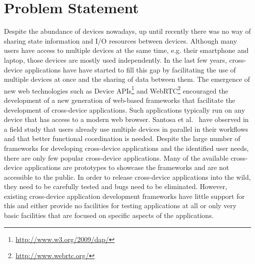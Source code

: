 \section{Problem Statement}

Despite the abundance of devices nowadays, up until recently there was no way of sharing state information and I/O resources between devices. Although many users have access to multiple devices at the same time, e.g. their smartphone and laptop, those devices are mostly used independently. In the last few years, cross-device applications have have started to fill this gap by facilitating the use of multiple devices at once and the sharing of data between them. The emergence of new web technologies such as Device APIs\footnote{\url{http://www.w3.org/2009/dap/}} and WebRTC\footnote{\url{http://www.webrtc.org/}} encouraged the development of a new generation of web-based frameworks that facilitate the development of cross-device applications. Such applications typically run on any device that has access to a modern web browser. Santosa et al.~\cite{santosa2013} have observed in a field study that users already use multiple devices in parallel in their workflows and that better functional coordination is needed. Despite the large number of frameworks for developing cross-device applications and the identified user needs, there are only few popular cross-device applications. Many of the available cross-device applications are prototypes to showcase the frameworks and are not accessible to the public. In order to release cross-device applications into the wild, they need to be carefully tested and bugs need to be eliminated. However, existing cross-device application development frameworks have little support for this and either provide no facilities for testing applications at all or only very basic facilities that are focused on specific aspects of the applications.  

